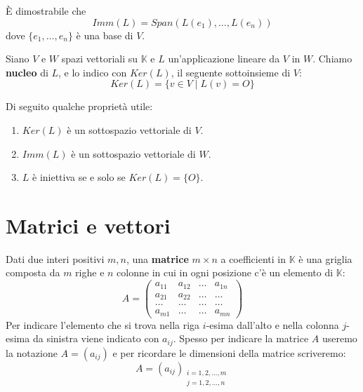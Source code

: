 \begin{proposition}
	\`E dimostrabile che \[ Imm(L) = Span(L(e_1), \dots, L(e_n)) \]
	dove $\{e_1, \dots, e_n\}$ \`e una base di $V$.
\end{proposition}

\begin{defn}
	Siano $V$ e $W$ spazi vettoriali su $\mathbb{K}$ e $L$ un'applicazione
	lineare da $V$ in $W$. Chiamo \textbf{nucleo} di $L$, e lo indico con
	$Ker(L)$, il seguente sottoinsieme di $V$:
	\begin{equation*}
		Ker(L) = \{v \in V \mid L(v) = O\}
	\end{equation*}
\end{defn}

Di seguito qualche propriet\`a utile:
\begin{enumerate}
	\item $Ker(L)$ \`e un sottospazio vettoriale di $V$.
	\item $Imm(L)$ \`e un sottospazio vettoriale di $W$.
	\item $L$ \`e iniettiva se e solo se $Ker(L) = \{O\}$.
\end{enumerate}

\section{Matrici e vettori}

\begin{defn}
	Dati due interi positivi $m, n$, una \textbf{matrice} $m \times n$
	a coefficienti in $\mathbb{K}$ \`e una griglia composta da $m$ righe
	e $n$ colonne in cui in ogni posizione c'\`e un elemento di
	$\mathbb{K}$:
	\begin{equation*}
		A = \begin{pmatrix}
			a_{11} & a_{12} & \dots & a_{1n} \\
			a_{21} & a_{22} & \dots & \dots  \\
			\dots  & \dots  & \dots & \dots  \\
			a_{m1} & \dots  & \dots & a_{mn}
		\end{pmatrix}
	\end{equation*}
	Per indicare l'elemento che si trova nella riga $i$-esima
	dall'alto e	nella colonna $j$-esima da sinistra viene indicato
	con $a_{ij}$. Spesso per indicare la matrice $A$ useremo la notazione
	$A = (a_{ij})$ e per ricordare le dimensioni della matrice scriveremo:
	\begin{equation*}
		A = (a_{ij})_{\substack{
					i = 1, 2, \dots, m \\
					j = 1, 2, \dots, n
				}}
	\end{equation*}
\end{defn}

